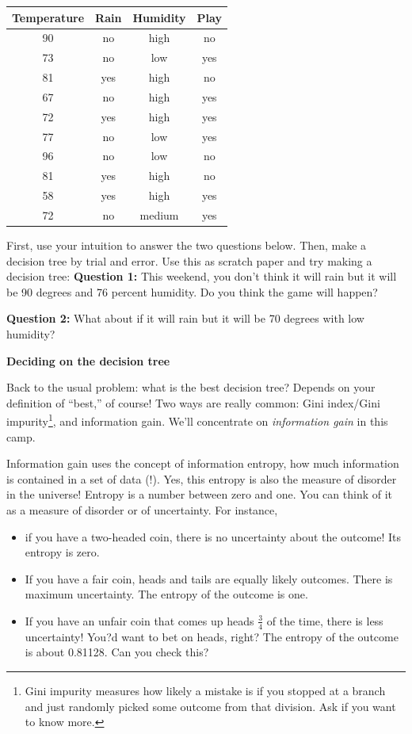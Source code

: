 \documentclass[10pt]{article}
\begin{document}
\begin{center}

\begin{tabular}{|c|c|c|c|}
\hline
Temperature &
Rain &
Humidity &
Play \\
\hline
90 &
no &
high &
no \\
73&
no&
low&
yes \\
81&
yes&
high&
no \\
67&
no&
high&
yes\\
72&
yes&
high&
yes\\
77&
no&
low&
yes\\
96 &
no&
low&
no\\
81&
yes&
high&
no\\
58&
yes&
high&
yes\\
72&
no&
medium&
yes\\
\hline
\end{tabular}
\end{center}
First, use your intuition to answer the two questions below. Then, make a decision tree by trial and error. Use this as scratch paper and try making a decision tree:
\vfill
\textbf{Question 1:} This weekend, you don't think it will rain but it will be 90 degrees and 76 percent humidity. Do you think the game will happen? 

\bigskip


\textbf{Question 2:} What about if it will rain but it will be 70 degrees with low humidity?

\vfill

\pagebreak


\begin{center}
\textbf{Deciding on the decision tree}
\end{center}
Back to the usual problem: what is the best decision tree? Depends on your definition of ``best,'' of course! Two ways are really common: Gini index/Gini impurity\footnote{Gini impurity measures how likely a mistake is if you stopped at a branch and just randomly picked some outcome from that division. Ask if you want to know more.}, and information gain. We'll concentrate on \textit{information gain} in this camp.


Information gain uses the concept of information entropy, how much information is contained in a set of data (!). Yes, this entropy is also the measure of disorder in the universe! Entropy is a number between zero and one. You can think of it as a measure of disorder or of uncertainty. For instance, 
\begin{itemize}
\item if you have a two-headed coin, there is no uncertainty about the outcome! Its entropy is zero.
\item If you have a fair coin, heads and tails are equally likely outcomes. There is maximum uncertainty. The entropy of the outcome is one.
\item  If you have an unfair coin that comes up heads $\frac{3}{4}$ of the time, there is less uncertainty! You?d want to bet on heads, right? The entropy of the outcome is about 0.81128. 
Can you check this?
\end{itemize}
\end{document}
